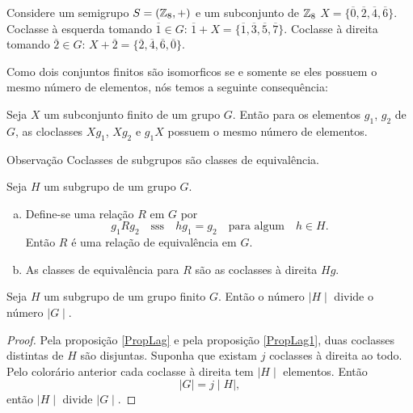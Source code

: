 \begin{definition}[Magma]
         \begin{exmp}
            Considere um semigrupo $S = (\mathbb{Z}_{8},+)$ e um subconjunto de $\mathbb{Z}_{8}$ $X=\{\overline{0},\overline{2},\overline{4},\overline{6}\}$.
            Coclasse à esquerda tomando $\overline{1} \in G$: $\overline{1} + X = \{\overline{1},\overline{3},\overline{5},\overline{7}\}$.
            Coclasse à direita tomando $\overline{2} \in G$: $X + \overline{2} = \{\overline{2},\overline{4},\overline{6},\overline{0}\}$.
         \end{exmp}

         Como dois conjuntos finitos são isomorficos se e somente se eles possuem o mesmo número de elementos, nós temos a seguinte consequência:
         \begin{corollary}
            Seja $X$ um subconjunto finito de um grupo $G$. Então para os elementos $g_{1}$, $g_{2}$ de $G$, as cloclasses $Xg_{1}$, $Xg_{2}$ e $g_{1}X$ possuem o mesmo número de elementos.
         \end{corollary}
         \begin{mymdframed}{Observação}
            Coclasses de subgrupos são classes de equivalência.
         \end{mymdframed}
         \begin{stat}\label{PropLag}
         Seja $H$ um subgrupo de um grupo $G$.
         \begin{enumerate}[a.]
            \item Define-se uma relação $R$ em $G$ por $$ g_{1} R g_{2}\quad \textrm{sss}\quad hg_{1} = g_{2}\quad \textrm{para\ algum}\quad h\in H.$$ Então $R$ é uma relação de equivalência em $G$.
            \item As classes de equivalência para $R$ são as coclasses à direita $Hg$.
         \end{enumerate}
         \end{stat}
         \begin{theorem}
         Seja $H$ um subgrupo de um grupo finito $G$. Então o número $\mid H\mid$ divide o número $\mid G\mid$.
         \begin{proof}
            Pela proposição \ref{PropLag} e pela proposição \ref{PropLag1}, duas coclasses distintas de $H$ são disjuntas. Suponha que existam $j$ coclasses à direita ao todo. Pelo colorário anterior cada coclasse à direita tem $\mid H \mid$ elementos. Então
            $$ \mid G\mid = j\mid H\mid,$$ então $\mid H \mid $ divide $\mid G \mid $.
         \end{proof}
         \end{theorem}


\end{definition}
